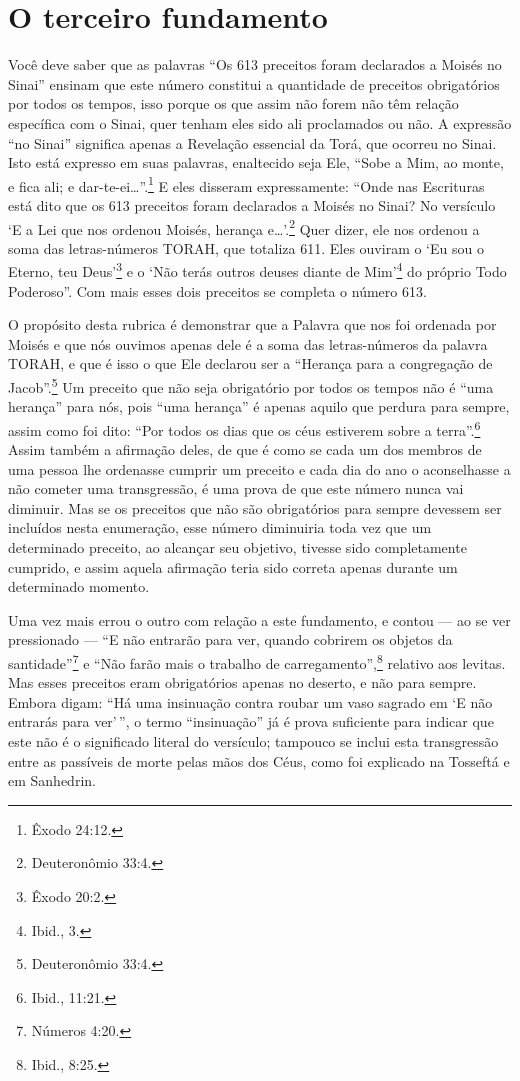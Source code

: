 \chapter*{O terceiro fundamento}

Você deve saber que as palavras ``Os 613 preceitos foram declarados a
Moisés no Sinai'' ensinam que este número constitui a quantidade de
preceitos obrigatórios por todos os tempos, isso porque os que assim não
forem não têm relação específica com o Sinai, quer tenham eles sido ali
proclamados ou não. A expressão ``no Sinai'' significa apenas a
Revelação essencial da Torá, que ocorreu no Sinai. Isto está expresso
em suas palavras, enaltecido seja Ele, ``Sobe a Mim, ao monte, e fica
ali; e dar-te-ei\ldots{}''.\footnote{Êxodo 24:12.} E eles disseram expressamente:
``Onde nas Escrituras está dito que os 613 preceitos foram declarados a
Moisés no Sinai? No versículo `E a Lei que nos ordenou Moisés, herança
e\ldots{}'.\footnote{Deuteronômio 33:4.} Quer dizer, ele nos ordenou a soma das
letras-números TORAH, que totaliza 611. Eles ouviram o `Eu sou o
Eterno, teu Deus'\footnote{Êxodo 20:2.} e o `Não terás outros deuses diante de
Mim'\footnote{Ibid., 3.} do próprio Todo Poderoso''. Com mais esses dois
preceitos se completa o número 613.

O propósito desta rubrica é demonstrar que a Palavra que nos foi
ordenada por Moisés e que nós ouvimos apenas dele é a soma das
letras-números da palavra TORAH, e que é isso o que Ele declarou ser a
``Herança para a congregação de Jacob''.\footnote{Deuteronômio 33:4.} Um preceito
que não seja obrigatório por todos os tempos não é ``uma herança'' para
nós, pois ``uma herança'' é apenas aquilo que perdura para sempre,
assim como foi dito: ``Por todos os dias que os céus estiverem sobre a
terra''.\footnote{Ibid., 11:21.} Assim também a afirmação deles, de que é como
se cada um dos membros de uma pessoa lhe ordenasse cumprir um preceito
e cada dia do ano o aconselhasse a não cometer uma transgressão, é uma
prova de que este número nunca vai diminuir. Mas se os preceitos que não
são obrigatórios para sempre devessem ser incluídos nesta enumeração,
esse número diminuiria toda vez que um determinado preceito, ao alcançar
seu objetivo, tivesse sido completamente cumprido, e assim aquela
afirmação teria sido correta apenas durante um determinado momento.

Uma vez mais errou o outro com relação a este fundamento, e contou ---
ao se ver pressionado --- ``E não entrarão para ver, quando cobrirem os
objetos da santidade''\footnote{Números 4:20.} e ``Não farão mais o trabalho de
carregamento'',\footnote{Ibid., 8:25.} relativo aos levitas. Mas esses preceitos
eram obrigatórios apenas no deserto, e não para sempre. Embora digam:
``Há uma insinuação contra roubar um vaso sagrado em `E não entrarás
para ver'\,'', o termo ``insinuação'' já é prova suficiente para indicar
que este não é o significado literal do versículo; tampouco se inclui
esta transgressão entre as passíveis de morte pelas mãos dos Céus, como
foi explicado na Tosseftá e em Sanhedrin.

